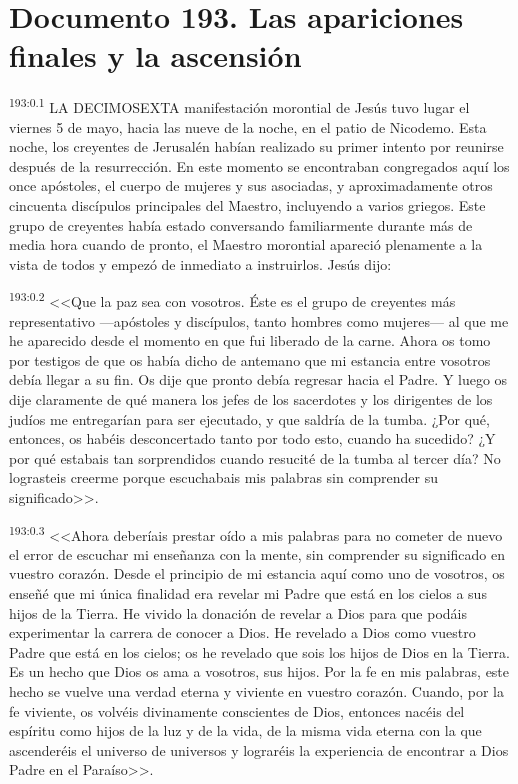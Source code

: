 \chapter{Documento 193. Las apariciones finales y la ascensión}
\par 
\textsuperscript{193:0.1} LA DECIMOSEXTA manifestación morontial de Jesús tuvo lugar el viernes 5 de mayo, hacia las nueve de la noche, en el patio de Nicodemo. Esta noche, los creyentes de Jerusalén habían realizado su primer intento por reunirse después de la resurrección. En este momento se encontraban congregados aquí los once apóstoles, el cuerpo de mujeres y sus asociadas, y aproximadamente otros cincuenta discípulos principales del Maestro, incluyendo a varios griegos. Este grupo de creyentes había estado conversando familiarmente durante más de media hora cuando de pronto, el Maestro morontial apareció plenamente a la vista de todos y empezó de inmediato a instruirlos. Jesús dijo:

\par 
\textsuperscript{193:0.2} <<Que la paz sea con vosotros. Éste es el grupo de creyentes más representativo ---apóstoles y discípulos, tanto hombres como mujeres--- al que me he aparecido desde el momento en que fui liberado de la carne. Ahora os tomo por testigos de que os había dicho de antemano que mi estancia entre vosotros debía llegar a su fin. Os dije que pronto debía regresar hacia el Padre. Y luego os dije claramente de qué manera los jefes de los sacerdotes y los dirigentes de los judíos me entregarían para ser ejecutado, y que saldría de la tumba. ¿Por qué, entonces, os habéis desconcertado tanto por todo esto, cuando ha sucedido? ¿Y por qué estabais tan sorprendidos cuando resucité de la tumba al tercer día? No lograsteis creerme porque escuchabais mis palabras sin comprender su significado>>.

\par 
\textsuperscript{193:0.3} <<Ahora deberíais prestar oído a mis palabras para no cometer de nuevo el error de escuchar mi enseñanza con la mente, sin comprender su significado en vuestro corazón. Desde el principio de mi estancia aquí como uno de vosotros, os enseñé que mi única finalidad era revelar mi Padre que está en los cielos a sus hijos de la Tierra. He vivido la donación de revelar a Dios para que podáis experimentar la carrera de conocer a Dios. He revelado a Dios como vuestro Padre que está en los cielos; os he revelado que sois los hijos de Dios en la Tierra. Es un hecho que Dios os ama a vosotros, sus hijos. Por la fe en mis palabras, este hecho se vuelve una verdad eterna y viviente en vuestro corazón. Cuando, por la fe viviente, os volvéis divinamente conscientes de Dios, entonces nacéis del espíritu como hijos de la luz y de la vida, de la misma vida eterna con la que ascenderéis el universo de universos y lograréis la experiencia de encontrar a Dios Padre en el Paraíso>>.

